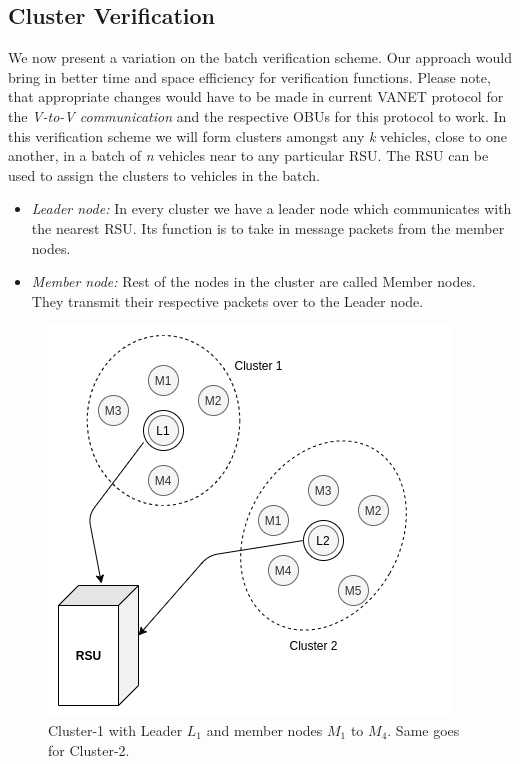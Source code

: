 \documentclass[10pt,journal,letterpaper]{IEEEtran}
\begin{document}
\subsection{Cluster Verification}
We now present a variation on the batch verification scheme. Our
approach would bring in better time and space efficiency for
verification functions. Please note, that appropriate changes would
have to be made in current VANET protocol for the \emph{V-to-V
communication} and the respective OBUs for this protocol to work. In
this verification scheme we will form clusters amongst any \emph{k}
vehicles, close to one another, in a batch of \emph{n} vehicles near
to any particular RSU. The RSU can be used to assign the clusters to
vehicles in the batch.
\begin{itemize}
\item{\emph{Leader node:}} In every cluster we have a leader node which communicates with the nearest RSU. Its function is to take in message packets from the member nodes.
\item{\emph{Member node:}} Rest of the nodes in the cluster are called Member nodes. They transmit their respective packets over to the Leader node.
\end{itemize}
\begin{figure}[h]
    \centering
    \captionsetup{justification=centering}
    \includegraphics[scale=0.4]{Cluster.png}
    \caption{Cluster-1 with Leader $L_1$ and member nodes $M_1$ to $M_4$. Same goes for Cluster-2.}
    \label{fig:cluster}
\end{figure}
\end{document}
